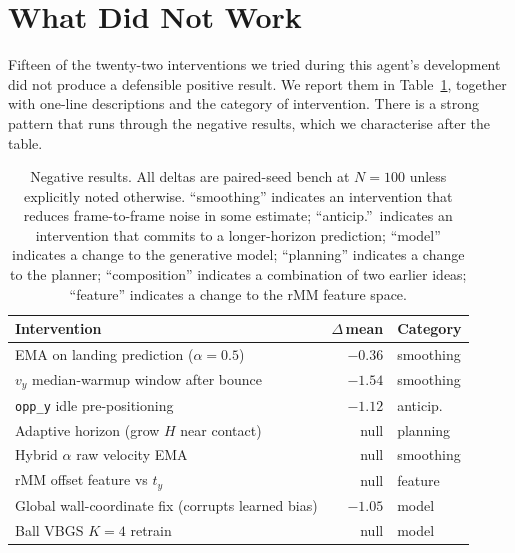 \documentclass[runningheads]{llncs}
\begin{document}
\section{What Did Not Work}\label{sec:negatives}

Fifteen of the twenty-two interventions we tried during this
agent's development did not produce a defensible positive result.
We report them in Table~\ref{tab:neg}, together with one-line
descriptions and the category of intervention. There is a strong
pattern that runs through the negative results, which we
characterise after the table.

\begin{table}[t]
\caption{Negative results. All deltas are paired-seed bench at
$N{=}100$ unless explicitly noted otherwise. ``smoothing''
indicates an intervention that reduces frame-to-frame noise in
some estimate; ``anticip.''\ indicates an intervention that commits
to a longer-horizon prediction; ``model'' indicates a change to
the generative model; ``planning'' indicates a change to the
planner; ``composition'' indicates a combination of two earlier
ideas; ``feature'' indicates a change to the rMM feature
space.}\label{tab:neg}
\centering
\begin{tabular}{lrl}
\toprule
Intervention                                                    & $\Delta$\,mean    & Category    \\
\midrule
EMA on landing prediction ($\alpha{=}0.5$)                      & $-0.36$           & smoothing   \\
$v_y$ median-warmup window after bounce                         & $-1.54$           & smoothing   \\
\texttt{opp\_y} idle pre-positioning                            & $-1.12$           & anticip.    \\
Adaptive horizon (grow $H$ near contact)                        & null              & planning    \\
Hybrid $\alpha$ raw velocity EMA                                & null              & smoothing   \\
rMM offset feature vs $t_y$                                     & null              & feature     \\
Global wall-coordinate fix (corrupts learned bias)              & $-1.05$           & model       \\
Ball VBGS $K{=}4$ retrain                                       & null              & model       \\

\end{tabular}
\end{table}
\end{document}

